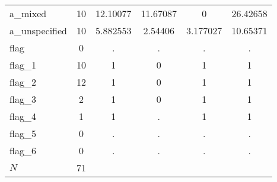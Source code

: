 \begin{table}[htbp]
\begin{tabular}{l*{1}{ccccc}}
a\_mixed     &          10&    12.10077&    11.67087&           0&    26.42658\\
a\_unspecified&          10&    5.882553&     2.54406&    3.177027&    10.65371\\
flag        &           0&           .&           .&           .&           .\\
flag\_1      &          10&           1&           0&           1&           1\\
flag\_2      &          12&           1&           0&           1&           1\\
flag\_3      &           2&           1&           0&           1&           1\\
flag\_4      &           1&           1&           .&           1&           1\\
flag\_5      &           0&           .&           .&           .&           .\\
flag\_6      &           0&           .&           .&           .&           .\\
\hline
\(N\)       &          71&            &            &            &            \\
\hline\hline
\end{tabular}
\end{table}
